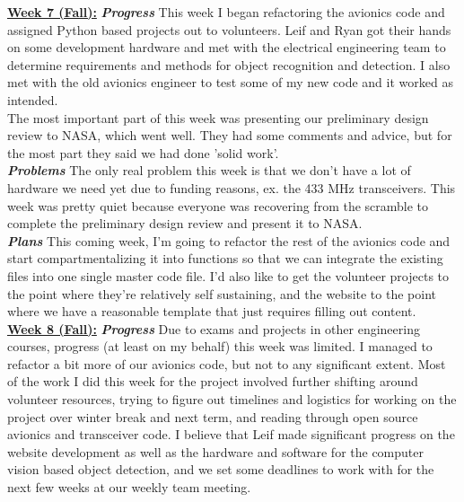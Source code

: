 \documentclass[onecolumn, draftclsnofoot, 10pt, compsoc]{IEEEtran}
\begin{document}
\underline{\textbf{Week 7 (Fall):}}
\newline\textbf{\textit{{Progress}}}
\newline This week I began refactoring the avionics code and assigned Python based projects out to volunteers. 
Leif and Ryan got their hands on some development hardware and met with the electrical engineering team
to determine requirements and methods for object recognition and detection. I also met with the old
avionics engineer to test some of my new code and it worked as intended. \\

The most important part of this week was presenting our preliminary design review to NASA, which went
well. They had some comments and advice, but for the most part they said we had done 'solid work'. \\

\textbf{\textit{{Problems}}}
\newline The only real problem this week is that we don't have a lot of hardware we need yet due to funding reasons,
ex. the 433 MHz transceivers. This week was pretty quiet because everyone was recovering from the scramble
to complete the preliminary design review and present it to NASA. \\

\textbf{\textit{{Plans}}}
\newline This coming week, I'm going to refactor the rest of the avionics code and start compartmentalizing it
into functions so that we can integrate the existing files into one single master code file. I'd also
like to get the volunteer projects to the point where they're relatively self sustaining, and the website
to the point where we have a reasonable template that just requires filling out content. \\

\underline{\textbf{Week 8 (Fall):}}
\newline\textbf{\textit{{Progress}}}
\newline Due to exams and projects in other engineering courses, progress (at least on my behalf) this week was
limited. I managed to refactor a bit more of our avionics code, but not to any significant extent. Most
of the work I did this week for the project involved further shifting around volunteer resources, 
trying to figure out timelines and logistics for working on the project over winter break and next term,
and reading through open source avionics and transceiver code. I believe that Leif made significant 
progress on the website development as well as the hardware and software for the computer vision based
object detection, and we set some deadlines to work with for the next few weeks at our weekly team
meeting. \\
\end{document}
